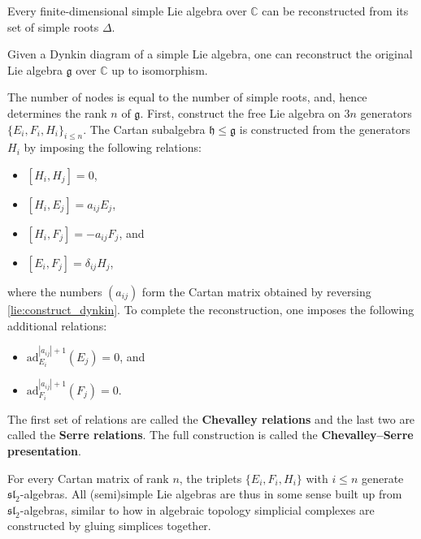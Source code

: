     \begin{theorem}
        Every finite-dimensional simple Lie algebra over $\mathbb{C}$ can be reconstructed from its set of simple roots $\Delta$.
    \end{theorem}
    \begin{construct}\label{lie:reconstruction}
        Given a Dynkin diagram of a simple Lie algebra, one can reconstruct the original Lie algebra $\mathfrak{g}$ over $\mathbb{C}$ up to isomorphism.

        The number of nodes is equal to the number of simple roots, and, hence determines the rank $n$ of $\mathfrak{g}$. First, construct the free Lie algebra on $3n$ generators $\{E_i,F_i,H_i\}_{i\leq n}$. The Cartan subalgebra $\mathfrak{h}\leq\mathfrak{g}$ is constructed from the generators $H_i$ by imposing the following relations:
        \begin{itemize}
            \item $[H_i,H_j] = 0$,
            \item $[H_i,E_j] = a_{ij}E_j$,
            \item $[H_i,F_j] = -a_{ij}F_j$, and
            \item $[E_i,F_j] = \delta_{ij}H_j$,
        \end{itemize}
        where the numbers $(a_{ij})$ form the Cartan matrix obtained by reversing \cref{lie:construct_dynkin}. To complete the reconstruction, one imposes the following additional relations:
        \begin{itemize}
            \item $\mathrm{ad}_{E_i}^{|a_{ij}|+1}(E_j) = 0$, and
            \item $\mathrm{ad}_{F_i}^{|a_{ij}|+1}(F_j) = 0$.
        \end{itemize}
        The first set of relations are called the \textbf{Chevalley relations} and the last two are called the \textbf{Serre relations}. The full construction is called the \textbf{Chevalley--Serre presentation}.
    \end{construct}

    \begin{property}[$\mathfrak{sl}_2$]
        For every Cartan matrix of rank $n$, the triplets $\{E_i,F_i,H_i\}$ with $i\leq n$ generate $\mathfrak{sl}_2$-algebras. All (semi)simple Lie algebras are thus in some sense built up from $\mathfrak{sl}_2$-algebras, similar to how in algebraic topology simplicial complexes are constructed by gluing simplices together.
    \end{property}

